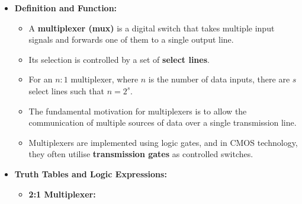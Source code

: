 \documentclass{article}
\begin{document}
\begin{itemize}
    \item \textbf{Definition and Function:}
    \begin{itemize}
        \item A \textbf{multiplexer (mux)} is a digital switch that takes multiple input signals and forwards one of them to a single output line.
        \item Its selection is controlled by a set of \textbf{select lines}.
        \item For an $n:1$ multiplexer, where $n$ is the number of data inputs, there are $s$ select lines such that $n = 2^s$.
        \item The fundamental motivation for multiplexers is to allow the communication of multiple sources of data over a single transmission line.
        \item Multiplexers are implemented using logic gates, and in CMOS technology, they often utilise \textbf{transmission gates} as controlled switches.
    \end{itemize}
    \item \textbf{Truth Tables and Logic Expressions:}
    \begin{itemize}
        \item \textbf{2:1 Multiplexer:}
\end{itemize}
\end{itemize}
\end{document}
